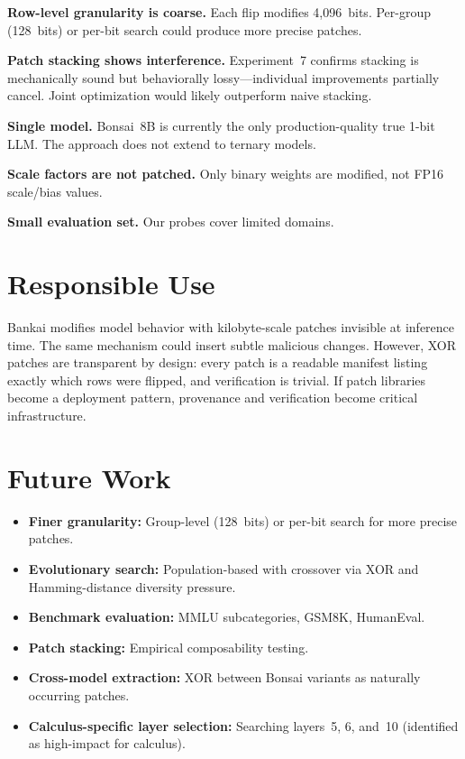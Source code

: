 \documentclass[11pt,a4paper]{article}
\begin{document}
\textbf{Row-level granularity is coarse.} Each flip modifies 4,096~bits.
Per-group (128~bits) or per-bit search could produce more precise patches.

\textbf{Patch stacking shows interference.} Experiment~7 confirms
stacking is mechanically sound but behaviorally lossy---individual
improvements partially cancel. Joint optimization would likely
outperform naive stacking.

\textbf{Single model.} Bonsai~8B is currently the only production-quality
true 1-bit LLM. The approach does not extend to ternary models.

\textbf{Scale factors are not patched.} Only binary weights are modified,
not FP16 scale/bias values.

\textbf{Small evaluation set.} Our probes cover limited domains.

\section{Responsible Use}

Bankai modifies model behavior with kilobyte-scale patches invisible at
inference time. The same mechanism could insert subtle malicious changes.
However, XOR patches are transparent by design: every patch is a readable
manifest listing exactly which rows were flipped, and verification is
trivial. If patch libraries become a deployment pattern, provenance and
verification become critical infrastructure.

\section{Future Work}

\begin{itemize}[nosep]
  \item \textbf{Finer granularity:} Group-level (128~bits) or per-bit
    search for more precise patches.
  \item \textbf{Evolutionary search:} Population-based with crossover
    via XOR and Hamming-distance diversity pressure.
  \item \textbf{Benchmark evaluation:} MMLU subcategories, GSM8K,
    HumanEval.
  \item \textbf{Patch stacking:} Empirical composability testing.
  \item \textbf{Cross-model extraction:} XOR between Bonsai variants
    as naturally occurring patches.
  \item \textbf{Calculus-specific layer selection:} Searching layers~5,
    6, and~10 (identified as high-impact for calculus).
\end{itemize}
\end{document}
